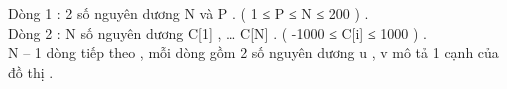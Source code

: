 Dòng 1 : 2 số nguyên dương N và P . ( 1 ≤ P ≤ N ≤ 200 ) .   
\\   Dòng 2 : N số nguyên dương C[1] , … C[N] . ( -1000 ≤ C[i] ≤ 1000 ) .   
\\   N – 1 dòng tiếp theo , mỗi dòng gồm 2 số nguyên dương u , v mô tả 1 cạnh của đồ thị .   
\\